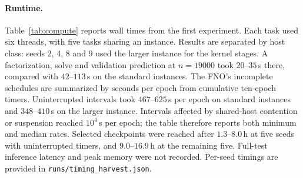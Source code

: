 \paragraph{Runtime.} Table~\ref{tab:compute} reports wall times from
the first experiment. Each task used six threads, with five tasks sharing an
instance. Results are separated by host class: seeds 2, 4, 8 and 9 used the
larger instance for the kernel stages. A factorization, solve and validation
prediction at $n=19000$ took $20$--$35$\,s there, compared with
$42$--$113$\,s on the standard instances. The FNO's incomplete schedules
are summarized by seconds per epoch from cumulative ten-epoch timers.
Uninterrupted intervals took $467$--$625$\,s per epoch on standard
instances and $348$--$410$\,s on the larger instance. Intervals affected by
shared-host contention or suspension reached $10^4$\,s per epoch; the table
therefore reports both minimum and median rates. Selected checkpoints were
reached after $1.3$--$8.0$\,h at five seeds with uninterrupted timers, and
$9.0$--$16.9$\,h at the remaining five. Full-test inference latency and
peak memory were not recorded. Per-seed timings are provided in \texttt{runs/timing\_harvest.json}.


